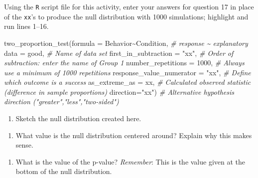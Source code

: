 \documentclass[
]{report}
\newenvironment{Shaded}{\begin{snugshade}}{\end{snugshade}}
\newcommand{\AttributeTok}[1]{\textcolor[rgb]{0.77,0.63,0.00}{#1}}
\newcommand{\CommentTok}[1]{\textcolor[rgb]{0.56,0.35,0.01}{\textit{#1}}}
\newcommand{\DecValTok}[1]{\textcolor[rgb]{0.00,0.00,0.81}{#1}}
\newcommand{\FunctionTok}[1]{\textcolor[rgb]{0.00,0.00,0.00}{#1}}
\newcommand{\NormalTok}[1]{#1}
\newcommand{\SpecialCharTok}[1]{\textcolor[rgb]{0.00,0.00,0.00}{#1}}
\newcommand{\StringTok}[1]{\textcolor[rgb]{0.31,0.60,0.02}{#1}}
\providecommand{\tightlist}{%
  \setlength{\itemsep}{0pt}\setlength{\parskip}{0pt}}
\begin{document}
Using the \texttt{R} script file for this activity, enter your answers for question 17 in place of the \texttt{xx}'s to produce the null distribution with 1000 simulations; highlight and run lines 1--16.

\begin{Shaded}
\begin{Highlighting}[]
\FunctionTok{two\_proportion\_test}\NormalTok{(}\AttributeTok{formula =}\NormalTok{ Behavior}\SpecialCharTok{\textasciitilde{}}\NormalTok{Condition, }\CommentTok{\# response \textasciitilde{} explanatory}
    \AttributeTok{data =}\NormalTok{ good, }\CommentTok{\# Name of data set}
    \AttributeTok{first\_in\_subtraction =} \StringTok{"xx"}\NormalTok{, }\CommentTok{\# Order of subtraction: enter the name of Group 1}
    \AttributeTok{number\_repetitions =} \DecValTok{1000}\NormalTok{, }\CommentTok{\# Always use a minimum of 1000 repetitions}
    \AttributeTok{response\_value\_numerator =} \StringTok{"xx"}\NormalTok{, }\CommentTok{\# Define which outcome is a success }
    \AttributeTok{as\_extreme\_as =}\NormalTok{ xx, }\CommentTok{\# Calculated observed statistic (difference in sample proportions)}
    \AttributeTok{direction=}\StringTok{"xx"}\NormalTok{) }\CommentTok{\# Alternative hypothesis direction ("greater","less","two{-}sided")}
\end{Highlighting}
\end{Shaded}

\begin{enumerate}
\def\labelenumi{\arabic{enumi}.}
\setcounter{enumi}{16}
\tightlist
\item
  Sketch the null distribution created here.
\end{enumerate}

\vspace{1.5in}

\begin{enumerate}
\def\labelenumi{\arabic{enumi}.}
\setcounter{enumi}{17}
\tightlist
\item
  What value is the null distribution centered around? Explain why this makes sense.
\end{enumerate}

\vspace{.8in}

\begin{enumerate}
\def\labelenumi{\arabic{enumi}.}
\setcounter{enumi}{18}
\tightlist
\item
  What is the value of the p-value? \emph{Remember}: This is the value given at the bottom of the null distribution.
\end{enumerate}
\end{document}
